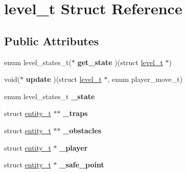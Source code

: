 \hypertarget{structlevel__t}{}\section{level\+\_\+t Struct Reference}
\label{structlevel__t}
\subsection*{Public Attributes}
\begin{DoxyCompactItemize}
\item 
enum level\+\_\+states\+\_\+t($\ast$ {\bfseries get\+\_\+state} )(struct \hyperlink{structlevel__t}{level\+\_\+t} $\ast$)\hypertarget{structlevel__t_a220cdf51d04a7a423b99f0d337c066b2}{}\label{structlevel__t_a220cdf51d04a7a423b99f0d337c066b2}

\item 
void($\ast$ {\bfseries update} )(struct \hyperlink{structlevel__t}{level\+\_\+t} $\ast$, enum player\+\_\+move\+\_\+t)\hypertarget{structlevel__t_ac4dbbb1c4e8531e48ce85a14fa2f2374}{}\label{structlevel__t_ac4dbbb1c4e8531e48ce85a14fa2f2374}

\item 
enum level\+\_\+states\+\_\+t {\bfseries \+\_\+state}\hypertarget{structlevel__t_a26af37b0126367d71422c0a7d65c5fc2}{}\label{structlevel__t_a26af37b0126367d71422c0a7d65c5fc2}

\item 
struct \hyperlink{structentity__t}{entity\+\_\+t} $\ast$$\ast$ {\bfseries \+\_\+traps}\hypertarget{structlevel__t_a28adb32ee1921739f671dc78c9979e3b}{}\label{structlevel__t_a28adb32ee1921739f671dc78c9979e3b}

\item 
struct \hyperlink{structentity__t}{entity\+\_\+t} $\ast$$\ast$ {\bfseries \+\_\+obstacles}\hypertarget{structlevel__t_ab850ac2799f4cdede73f7029c8708f7c}{}\label{structlevel__t_ab850ac2799f4cdede73f7029c8708f7c}

\item 
struct \hyperlink{structentity__t}{entity\+\_\+t} $\ast$ {\bfseries \+\_\+player}\hypertarget{structlevel__t_aaf9e8e5ea8e9c17be8519d6485fb8be3}{}\label{structlevel__t_aaf9e8e5ea8e9c17be8519d6485fb8be3}

\item 
struct \hyperlink{structentity__t}{entity\+\_\+t} $\ast$ {\bfseries \+\_\+safe\+\_\+point}\hypertarget{structlevel__t_a2fd281c1438e51d8f23555a25e555b4d}{}\label{structlevel__t_a2fd281c1438e51d8f23555a25e555b4d}


\end{DoxyCompactItemize}

